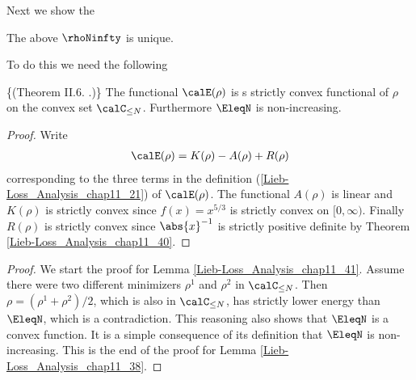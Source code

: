 \documentclass[openany, a4paper, oneside]{jsbook}
\begin{document}
Next we show the
\begin{lem}\label{Lieb-Loss_Analysis_chap11_38}
 The above $\rhoNinfty$ is unique.
\end{lem}
To do this we need the following
\begin{lem}\textup\{(Theorem II.6. \cite{LiebSimon1}.)\}\label{Lieb-Loss_Analysis_chap11_25}
 The functional $\calE (\rho)$ is s strictly convex functional of $\rho$ on the convex set $\calC_{\leq N}$.
 Furthermore $\EleqN$ is non-increasing.
\end{lem}
\begin{proof}
Write
\begin{align}
 \calE (\rho)
 =
 K (\rho) - A (\rho) + R (\rho)
\end{align}
corresponding to the three terms in the definition (\ref{Lieb-Loss_Analysis_chap11_21}) of $\calE (\rho)$.
The functional $A (\rho)$ is linear and $K (\rho)$ is strictly convex
since $f (x) = x^{5/3}$ is strictly convex on $[0, \infty)$.
Finally $R (\rho)$ is strictly convex since $\abs{x}^{-1}$ is strictly positive definite by Theorem \ref{Lieb-Loss_Analysis_chap11_40}.
\end{proof}

\begin{proof}
We start the proof for Lemma \ref{Lieb-Loss_Analysis_chap11_41}.
Assume there were two different minimizers $\rho^1$ and $\rho^2$ in $\calC_{\leq N}$.
Then $\rho = (\rho^1 + \rho^2) / 2$, which is also in $\calC_{\leq N}$, has strictly lower energy than $\EleqN$,
which is a contradiction.
This reasoning also shows that $\EleqN$ is a convex function.
It is a simple consequence of its definition that $\EleqN$ is non-increasing.
This is the end of the proof for Lemma \ref{Lieb-Loss_Analysis_chap11_38}.
\end{proof}
\end{document}
